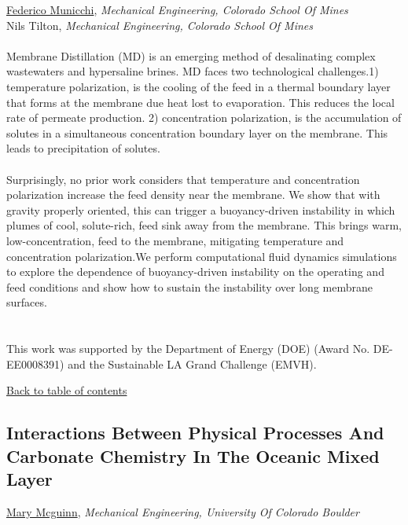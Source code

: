\underline{Federico Municchi}, \textit{Mechanical Engineering, Colorado School Of Mines}\\ 
{Nils Tilton}, \textit{Mechanical Engineering, Colorado School Of Mines}\\ 
\vspace{-0.1 in} \\ 
\noindent Membrane Distillation (MD) is an emerging method of desalinating complex wastewaters and hypersaline brines. MD faces two technological challenges.1) temperature polarization, is the cooling of the feed in a thermal boundary layer that forms at the membrane due heat lost to evaporation. This reduces the local rate of permeate production. 2) concentration polarization, is the accumulation of solutes in a simultaneous concentration boundary layer on the membrane. This leads to precipitation of solutes. \\ 
\noindent  \\ 
\noindent Surprisingly, no prior work considers that temperature and concentration polarization increase the feed density near the membrane. We show that with gravity properly oriented, this can trigger a buoyancy-driven instability in which plumes of cool, solute-rich, feed sink away from the membrane. This brings warm, low-concentration, feed to the membrane, mitigating temperature and concentration polarization.We perform computational fluid dynamics simulations to explore the dependence of buoyancy-driven instability on the operating and feed conditions and show how to sustain the instability over long membrane surfaces. \\ 
\noindent  \\ 
\noindent  \\ 
\noindent This work was supported by the Department of Energy (DOE) (Award No. DE-EE0008391) and the Sustainable LA Grand Challenge (EMVH). \\ 
\begin{flushright}\vspace{-0.2 in}\hyperlink{toc}{Back to table of contents}\end{flushright}\vspace{-0.2 in}
\hypertarget{MaryMcguinn}{\subsection*{\color{CUGOLD} Interactions Between Physical Processes And Carbonate Chemistry In The Oceanic Mixed Layer}} \vsp 
\underline{Mary Mcguinn}, \textit{Mechanical Engineering, University Of Colorado Boulder}\\ 
